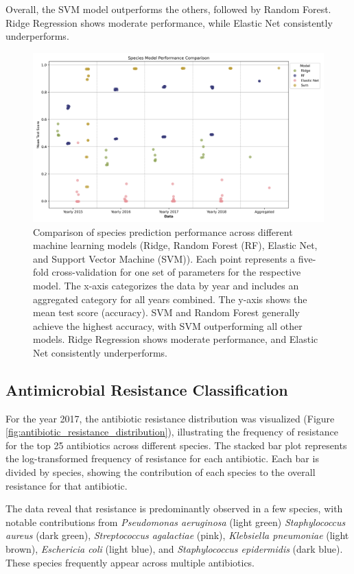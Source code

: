 \documentclass[english,11pt,a4paper,titlepage]{article}
\begin{document}
Overall, the SVM model outperforms the others, followed by Random Forest. Ridge Regression shows moderate performance, while Elastic Net consistently underperforms.

\begin{figure}[h]
	\includegraphics[width=0.9\linewidth]{img/species_model_comparison.png}
	\caption{Comparison of species prediction performance across different machine learning models (Ridge, Random Forest (RF), Elastic Net, and Support Vector Machine (SVM)). Each point represents a five-fold cross-validation for one set of parameters for the respective model. The x-axis categorizes the data by year and includes an aggregated category for all years combined. The y-axis shows the mean test score (accuracy). SVM and Random Forest generally achieve the highest accuracy, with SVM outperforming all other models. Ridge Regression shows moderate performance, and Elastic Net consistently underperforms.}
	\label{fig:model_comparison_species}
\end{figure}

\subsection*{Antimicrobial Resistance Classification}
For the year 2017, the antibiotic resistance distribution was visualized (Figure \ref{fig:antibiotic_resistance_distribution}), illustrating the frequency of resistance for the top 25 antibiotics across different species. The stacked bar plot represents the log-transformed frequency of resistance for each antibiotic. Each bar is divided by species, showing the contribution of each species to the overall resistance for that antibiotic.

The data reveal that resistance is predominantly observed in a few species, with notable contributions from \textit{Pseudomonas aeruginosa} (light green) \textit{Staphylococcus aureus} (dark green), \textit{Streptococcus agalactiae} (pink), \textit{Klebsiella pneumoniae} (light brown), \textit{Eschericia coli} (light blue), and \textit{Staphylococcus epidermidis} (dark blue). These species frequently appear across multiple antibiotics.
\end{document}
